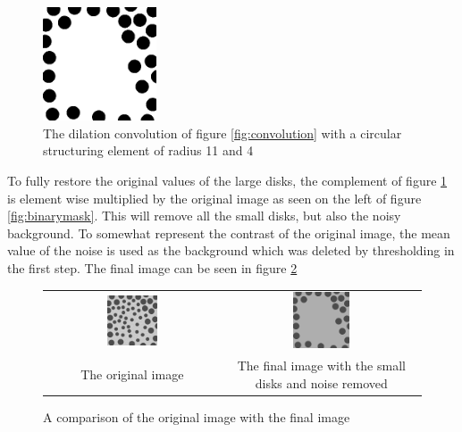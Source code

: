 \documentclass[a4paper]{article}
\begin{document}
\begin{figure}[H]
  \centering
  \includegraphics[width=0.3\textwidth]{../lab4ex3/restored.png} 
  \caption{The dilation convolution of figure \ref{fig:convolution} with a circular structuring element of radius 11 and 4}
  \label{fig:restored}
\end{figure}

\noindent To fully restore the original values of the large disks, the complement of figure \ref{fig:restored} is element wise multiplied by the original image as seen 
on the left of figure \ref{fig:binarymask}. This will remove all the small disks, but also the noisy background.
To somewhat represent the contrast of the original image, the mean value of the noise is used as the background which was deleted by thresholding
in the first step. The final image can be seen in figure \ref{fig:final}

\begin{figure}[H]
\centering
\begin{tabular}{cc}
    \includegraphics[width=0.3\textwidth]{../lab4ex3/blobs.png} & \includegraphics[width=0.3\textwidth]{../lab4ex3/final.png} \\
    The original image & The final image with the small disks and noise removed\\
\end{tabular}    
    
\caption{A comparison of the original image with the final image}
\label{fig:final}
\end{figure}
\end{document}
